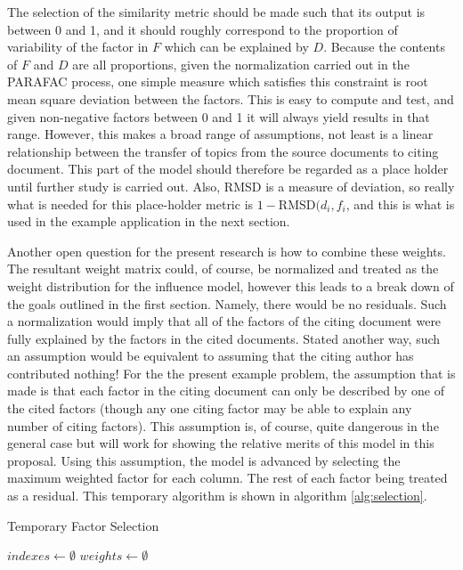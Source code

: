 \documentclass{article}
\begin{document}
The selection of the similarity metric should be made such that its
output is between 0 and 1, and it should roughly correspond to the
proportion of variability of the factor in $F$ which can be explained
by $D$.  Because the contents of $F$ and $D$ are all proportions,
given the normalization carried out in the PARAFAC process, one simple
measure which satisfies this constraint is root mean square deviation
between the factors.  This is easy to compute and test, and given
non-negative factors between 0 and 1 it will always yield results in
that range.  However, this makes a broad range of assumptions, not
least is a linear relationship between the transfer of topics from the
source documents to citing document.  This part of the model should
therefore be regarded as a place holder until further study is carried
out.  Also, RMSD is a measure of deviation, so really what is needed
for this place-holder metric is $1-\mathrm{RMSD}(d_i, f_i$, and this
is what is used in the example application in the next section.

Another open question for the present research is how to combine these
weights.  The resultant weight matrix could, of course, be normalized
and treated as the weight distribution for the influence model,
however this leads to a break down of the goals outlined in the first
section.  Namely, there would be no residuals.  Such a normalization
would imply that all of the factors of the citing document were fully
explained by the factors in the cited documents.  Stated another way,
such an assumption would be equivalent to assuming that the citing
author has contributed nothing!  For the the present example problem,
the assumption that is made is that each factor in the citing document
can only be described by one of the cited factors (though any one
citing factor may be able to explain any number of citing factors).
This assumption is, of course, quite dangerous in the general case but
will work for showing the relative merits of this model in this
proposal.  Using this assumption, the model is advanced by selecting
the maximum weighted factor for each column.  The rest of each factor
being treated as a residual.  This temporary algorithm is shown in
algorithm \ref{alg:selection}.

\begin{algorithm}
    \caption{Temporary Factor Selection}
    \label{alg:selection}
    $indexes \leftarrow \emptyset$\;
    $weights \leftarrow \emptyset$\;
\end{algorithm}
\end{document}
